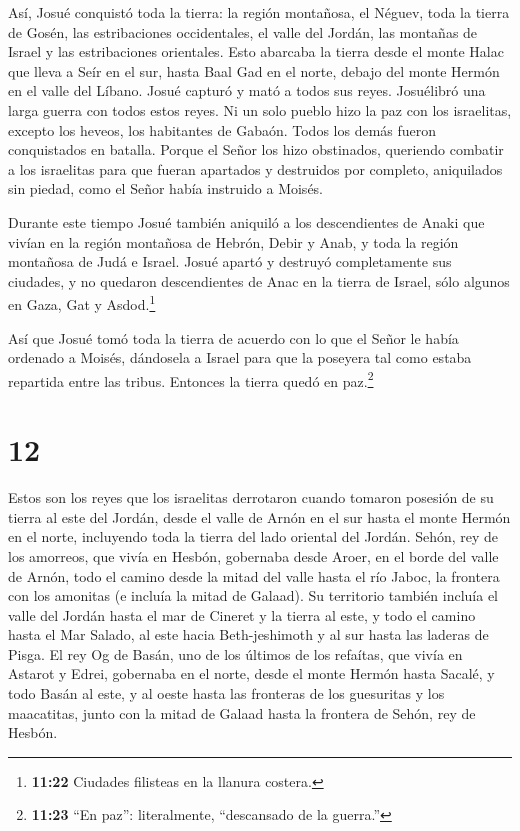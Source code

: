  Así, Josué conquistó toda la tierra: la región montañosa,
el Néguev, toda la tierra de Gosén, las estribaciones occidentales, el
valle del Jordán, las montañas de Israel y las estribaciones orientales.
 Esto abarcaba la tierra desde el monte Halac que lleva a
Seír en el sur, hasta Baal Gad en el norte, debajo del monte Hermón en
el valle del Líbano. Josué capturó y mató a todos sus reyes.
 Josuélibró una larga guerra con todos estos reyes.
 Ni un solo pueblo hizo la paz con los israelitas, excepto
los heveos, los habitantes de Gabaón. Todos los demás fueron
conquistados en batalla.  Porque el Señor los hizo
obstinados, queriendo combatir a los israelitas para que fueran
apartados y destruidos por completo, aniquilados sin piedad, como el
Señor había instruido a Moisés.

 Durante este tiempo Josué también aniquiló a los
descendientes de Anaki que vivían en la región montañosa de Hebrón,
Debir y Anab, y toda la región montañosa de Judá e Israel. Josué apartó
y destruyó completamente sus ciudades,  y no quedaron
descendientes de Anac en la tierra de Israel, sólo algunos en Gaza, Gat
y Asdod.\footnote{\textbf{11:22} Ciudades filisteas en la llanura
  costera.}

 Así que Josué tomó toda la tierra de acuerdo con lo que el
Señor le había ordenado a Moisés, dándosela a Israel para que la
poseyera tal como estaba repartida entre las tribus. Entonces la tierra
quedó en paz.\footnote{\textbf{11:23} ``En paz'': literalmente,
  ``descansado de la guerra.''}

\hypertarget{section-11}{%
\section{12}\label{section-11}}

 Estos son los reyes que los israelitas derrotaron cuando
tomaron posesión de su tierra al este del Jordán, desde el valle de
Arnón en el sur hasta el monte Hermón en el norte, incluyendo toda la
tierra del lado oriental del Jordán.  Sehón, rey de los
amorreos, que vivía en Hesbón, gobernaba desde Aroer, en el borde del
valle de Arnón, todo el camino desde la mitad del valle hasta el río
Jaboc, la frontera con los amonitas (e incluía la mitad de Galaad).
 Su territorio también incluía el valle del Jordán hasta el
mar de Cineret y la tierra al este, y todo el camino hasta el Mar
Salado, al este hacia Beth-jeshimoth y al sur hasta las laderas de
Pisga.  El rey Og de Basán, uno de los últimos de los
refaítas, que vivía en Astarot y Edrei,  gobernaba en el
norte, desde el monte Hermón hasta Sacalé, y todo Basán al este, y al
oeste hasta las fronteras de los guesuritas y los maacatitas, junto con
la mitad de Galaad hasta la frontera de Sehón, rey de Hesbón.

